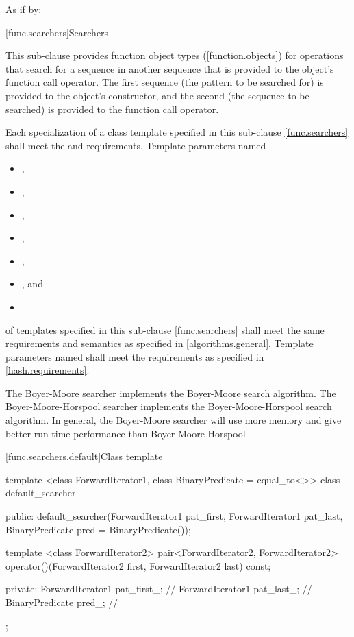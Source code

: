 \begin{itemdescr}
\pnum\effects As if by: 
\end{itemdescr}%

[func.searchers]{Searchers}

\pnum
This sub-clause provides function object types (\ref{function.objects}) for
operations that search for a sequence  in another
sequence  that is provided to the object's function call
operator.  The first sequence (the pattern to be searched for) is provided to
the object's constructor, and the second (the sequence to be searched) is
provided to the function call operator.

\pnum
Each specialization of a class template specified in this sub-clause \ref{func.searchers} shall meet the  and  requirements.
Template parameters named
\begin{itemize}
\item {},
\item {},
\item {},
\item {},
\item {},
\item {}, and
\item {}
\end{itemize}
of templates specified in this sub-clause
\ref{func.searchers} shall meet the same requirements and semantics as
specified in \ref{algorithms.general}.
Template parameters named  shall meet the requirements as specified in \ref{hash.requirements}.

\pnum
The Boyer-Moore searcher implements the Boyer-Moore search algorithm.
The Boyer-Moore-Horspool searcher implements the Boyer-Moore-Horspool search algorithm.
In general, the Boyer-Moore searcher will use more memory and give better run-time performance than Boyer-Moore-Horspool

[func.searchers.default]{Class template }

%
\begin{codeblock}
template <class ForwardIterator1, class BinaryPredicate = equal_to<>>
class default_searcher {
public:
  default_searcher(ForwardIterator1 pat_first, ForwardIterator1 pat_last,
                   BinaryPredicate pred = BinaryPredicate());

  template <class ForwardIterator2>
    pair<ForwardIterator2, ForwardIterator2>
      operator()(ForwardIterator2 first, ForwardIterator2 last) const;

private:
  ForwardIterator1 pat_first_; // \expos
  ForwardIterator1 pat_last_;  // \expos
  BinaryPredicate pred_;       // \expos
};
\end{codeblock}

